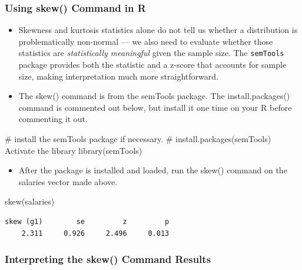 \documentclass[
  letterpaper,
  DIV=11,
  numbers=noendperiod]{scrreprt}
\newenvironment{Shaded}{\begin{snugshade}}{\end{snugshade}}
\newcommand{\CommentTok}[1]{\textcolor[rgb]{0.37,0.37,0.37}{#1}}
\newcommand{\FunctionTok}[1]{\textcolor[rgb]{0.28,0.35,0.67}{#1}}
\newcommand{\NormalTok}[1]{\textcolor[rgb]{0.00,0.23,0.31}{#1}}
\providecommand{\tightlist}{%
  \setlength{\itemsep}{0pt}\setlength{\parskip}{0pt}}\usepackage{longtable,booktabs,array}
\begin{document}
\subsubsection{Using skew() Command in R}\label{using-skew-command-in-r}

\begin{itemize}
\item
  Skewness and kurtosis statistics alone do not tell us whether a
  distribution is problematically non-normal --- we also need to
  evaluate whether those statistics are \emph{statistically meaningful}
  given the sample size. The \texttt{semTools} package provides both the
  statistic and a z-score that accounts for sample size, making
  interpretation much more straightforward.
\item
  The skew() command is from the semTools package. The
  install.packages() command is commented out below, but install it one
  time on your R before commenting it out.
\end{itemize}

\begin{Shaded}
\begin{Highlighting}[]
\CommentTok{\# install the semTools package if necessary.}
\CommentTok{\# install.packages(\textquotesingle{}semTools\textquotesingle{}) Activate the library}
\FunctionTok{library}\NormalTok{(semTools)}
\end{Highlighting}
\end{Shaded}

\begin{itemize}
\tightlist
\item
  After the package is installed and loaded, run the skew() command on
  the salaries vector made above.
\end{itemize}

\begin{Shaded}
\begin{Highlighting}[]
\FunctionTok{skew}\NormalTok{(salaries)}
\end{Highlighting}
\end{Shaded}

\begin{verbatim}
skew (g1)        se         z         p 
    2.311     0.926     2.496     0.013 
\end{verbatim}

\subsubsection{Interpreting the skew() Command
Results}\label{interpreting-the-skew-command-results}
\end{document}

